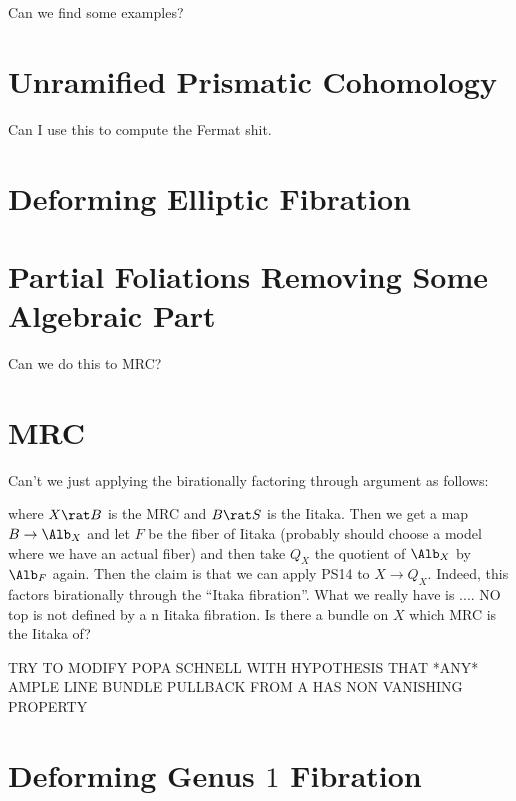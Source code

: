 \documentclass[12pt]{article}
\begin{document}
Can we find some examples?

\section{Unramified Prismatic Cohomology}

Can I use this to compute the Fermat shit.

\section{Deforming Elliptic Fibration}

\section{Partial Foliations Removing Some Algebraic Part}

Can we do this to MRC?

\section{MRC}

Can't we just applying the birationally factoring through argument as follows:

\begin{center}
\end{center}
where $X \rat B$ is the MRC and $B \rat  S$ is the Iitaka. Then we get a map $B \to \Alb_X$ and let $F$ be the fiber of Iitaka (probably should choose a model where we have an actual fiber) and then take $Q_X$ the quotient of $\Alb_X$ by $\Alb_F$ again. Then the claim is that we can apply PS14 to $X \to Q_X$. Indeed, this factors birationally through the ``Itaka fibration''. What we really have is .... NO top is not defined by a n Iitaka fibration. Is there a bundle on $X$ which MRC is the Iitaka of? 


TRY TO MODIFY POPA SCHNELL WITH HYPOTHESIS THAT *ANY* AMPLE LINE BUNDLE PULLBACK FROM A HAS NON VANISHING PROPERTY

\section{Deforming Genus $1$ Fibration}
\end{document}
